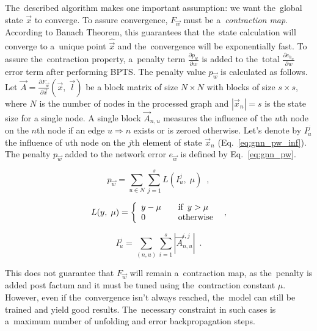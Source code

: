\documentclass{llncs}
\begin{document}
The~described algorithm makes one important assumption: we want the~global state $\vec{x}$ to converge. To assure convergence, $F_{\vec{w}}$ must be a~\emph{contraction map}. According to Banach Theorem, this guarantees that the~state calculation will converge to a~unique point $\hat{\vec{x}}$ and the~convergence will be exponentially fast. To assure the~contraction property, a~penalty term $\frac{\partial p_{w}}{\partial w}$ is added to the~total $\frac{\partial e_{h_w}}{\partial w}$ error term after performing BPTS. The penalty value $p_{\vec{w}}$ is calculated as follows.
Let $\vec{A} = \frac{\partial F_{\vec{w}}}{\partial \vec{x}}(\vec{x}, \; \vec{l})$ be a block matrix of size $N \times N$ with blocks of size $s \times s$, where $N$ is the number of nodes in the processed graph and $|\vec{x}_n| = s$ is the state size for a single node. A single block $\vec{A}_{n,u}$ measures the influence of the $u$th node on the $n$th node if an edge $u \Rightarrow n$ exists or is zeroed otherwise. Let's denote by $I_u^j$ the influence of $u$th node on the $j$th element of state $\vec{x}_n$ (Eq.~\ref{eq:gnn_pw_inf}). The penalty $p_{\vec{w}}$ added to the network error $e_{\vec{w}}$ is defined by Eq.~\ref{eq:gnn_pw}.

\begin{equation}
p_{\vec{w}} = \sum_{u \in N} \sum_{j = 1}^{s} L(I_u^j, \; \mu) \enspace ,
\label{eq:gnn_pw}
\end{equation}

\begin{equation}
L(y, \; \mu) = \left\{
\begin{array}{l l}
	y - \mu		& \quad \mbox{if} \enspace y > \mu \\
	0			& \quad \mbox{otherwise}
\end{array} \right. \enspace ,
\label{eq:gnn_pw_L}
\end{equation}

\begin{equation}
I_u^j =  \sum_{(n, u)} \sum_{i = 1}^{s} |\vec{A}_{n, u}^{i, j}| \enspace .
\label{eq:gnn_pw_inf}
\end{equation}


This does not guarantee that $F_{\vec{w}}$ will remain a~contraction map, as the~penalty is added post factum and it must be tuned using the~contraction constant $\mu$. However, even if the~convergence isn't always reached, the~model can still be trained and yield good results. The~necessary constraint in such cases is a~maximum number of unfolding and error backpropagation steps.
\end{document}
